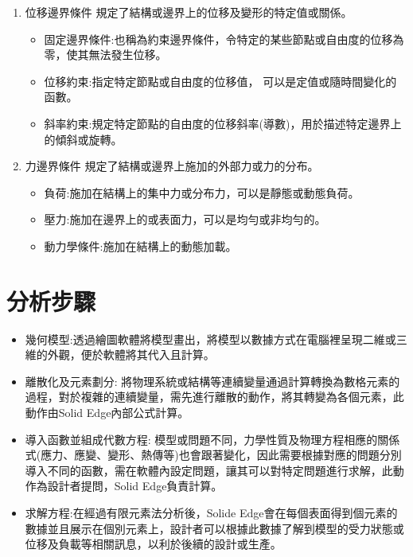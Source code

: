\begin{enumerate}
\item 位移邊界條件
規定了結構或邊界上的位移及變形的特定值或關係。

\begin{itemize}
\item 固定邊界條件:也稱為約束邊界條件，令特定的某些節點或自由度的位移為零，使其無法發生位移。
\item 位移約束:指定特定節點或自由度的位移值， 可以是定值或隨時間變化的函數。
\item 斜率約束:規定特定節點的自由度的位移斜率(導數)，用於描述特定邊界上的傾斜或旋轉。
\end{itemize}

\item 力邊界條件
規定了結構或邊界上施加的外部力或力的分布。

\begin{itemize}
\item 負荷:施加在結構上的集中力或分布力，可以是靜態或動態負荷。\\
\item 壓力:施加在邊界上的或表面力，可以是均勻或非均勻的。\\
\item 動力學條件:施加在結構上的動態加載。\\
\end{itemize}

\end{enumerate}
\newpage

\section{分析步驟}
\begin{itemize}
\item 幾何模型:透過繪圖軟體將模型畫出，將模型以數據方式在電腦裡呈現二維或三維的外觀，便於軟體將其代入且計算。
\item 離散化及元素劃分: 將物理系統或結構等連續變量通過計算轉換為數格元素的過程，對於複雜的連續變量，需先進行離散的動作，將其轉變為各個元素，此動作由Solid Edge內部公式計算。
\item 導入函數並組成代數方程: 模型或問題不同，力學性質及物理方程相應的關係式(應力、應變、變形、熱傳等)也會跟著變化，因此需要根據對應的問題分別導入不同的函數，需在軟體內設定問題，讓其可以對特定問題進行求解，此動作為設計者提問，Solid Edge負責計算。
\item 求解方程:在經過有限元素法分析後，Solide Edge會在每個表面得到個元素的數據並且展示在個別元素上，設計者可以根據此數據了解到模型的受力狀態或位移及負載等相關訊息，以利於後續的設計或生產。
\end{itemize}
\newpage
